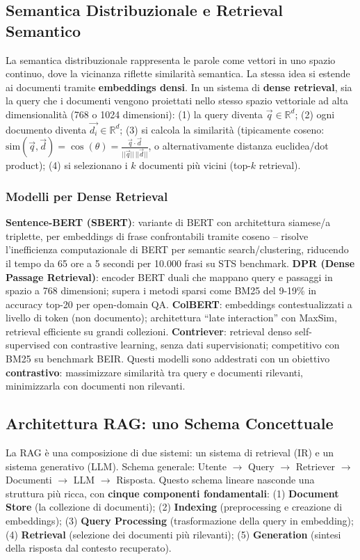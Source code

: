 \documentclass[12pt,a4paper]{article}
\begin{document}
\subsection{Semantica Distribuzionale e Retrieval Semantico}

La semantica distribuzionale rappresenta le parole come vettori in uno spazio continuo, dove la vicinanza riflette similarit\`a semantica. La stessa idea si estende ai documenti tramite \textbf{embeddings densi}. In un sistema di \textbf{dense retrieval}, sia la query che i documenti vengono proiettati nello stesso spazio vettoriale ad alta dimensionalit\`a (768 o 1024 dimensioni): (1) la query diventa $\vec{q}\in\mathbb{R}^d$; (2) ogni documento diventa $\vec{d_i}\in\mathbb{R}^d$; (3) si calcola la similarit\`a (tipicamente coseno: $\text{sim}(\vec{q},\vec{d})=\cos(\theta)=\frac{\vec{q}\cdot\vec{d}}{||\vec{q}||\,||\vec{d}||}$, o alternativamente distanza euclidea/dot product); (4) si selezionano i $k$ documenti pi\`u vicini (top-$k$ retrieval).

\subsubsection{Modelli per Dense Retrieval}

\textbf{Sentence-BERT (SBERT)}: variante di BERT con architettura siamese/a triplette, per embeddings di frase confrontabili tramite coseno -- risolve l'inefficienza computazionale di BERT per semantic search/clustering, riducendo il tempo da 65 ore a 5 secondi per 10.000 frasi su STS benchmark. \textbf{DPR (Dense Passage Retrieval)}: encoder BERT duali che mappano query e passaggi in spazio a 768 dimensioni; supera i metodi sparsi come BM25 del 9-19\% in accuracy top-20 per open-domain QA. \textbf{ColBERT}: embeddings contestualizzati a livello di token (non documento); architettura ``late interaction'' con MaxSim, retrieval efficiente su grandi collezioni. \textbf{Contriever}: retrieval denso self-supervised con contrastive learning, senza dati supervisionati; competitivo con BM25 su benchmark BEIR. Questi modelli sono addestrati con un obiettivo \textbf{contrastivo}: massimizzare similarit\`a tra query e documenti rilevanti, minimizzarla con documenti non rilevanti.

\subsection{Architettura RAG: uno Schema Concettuale}

La RAG \`e una composizione di due sistemi: un sistema di retrieval (IR) e un sistema generativo (LLM). Schema generale: Utente $\to$ Query $\to$ Retriever $\to$ Documenti $\to$ LLM $\to$ Risposta. Questo schema lineare nasconde una struttura pi\`u ricca, con \textbf{cinque componenti fondamentali}: (1) \textbf{Document Store} (la collezione di documenti); (2) \textbf{Indexing} (preprocessing e creazione di embeddings); (3) \textbf{Query Processing} (trasformazione della query in embedding); (4) \textbf{Retrieval} (selezione dei documenti pi\`u rilevanti); (5) \textbf{Generation} (sintesi della risposta dal contesto recuperato).
\end{document}
